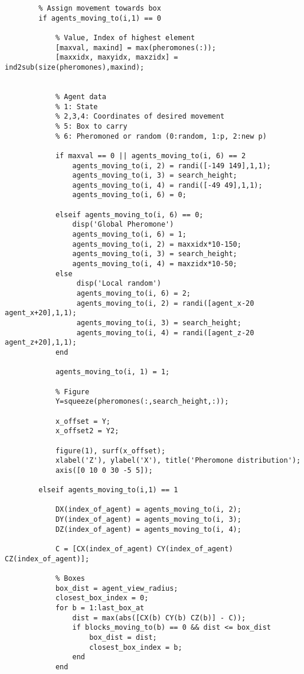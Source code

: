 \begin{lstlisting}
        % Assign movement towards box
        if agents_moving_to(i,1) == 0

            % Value, Index of highest element
            [maxval, maxind] = max(pheromones(:));
            [maxxidx, maxyidx, maxzidx] = ind2sub(size(pheromones),maxind);
            
            
            % Agent data
            % 1: State
            % 2,3,4: Coordinates of desired movement
            % 5: Box to carry
            % 6: Pheromoned or random (0:random, 1:p, 2:new p)
            
            if maxval == 0 || agents_moving_to(i, 6) == 2
                agents_moving_to(i, 2) = randi([-149 149],1,1);
                agents_moving_to(i, 3) = search_height; 
                agents_moving_to(i, 4) = randi([-49 49],1,1);
                agents_moving_to(i, 6) = 0;
                
            elseif agents_moving_to(i, 6) == 0;
                disp('Global Pheromone')
                agents_moving_to(i, 6) = 1;
                agents_moving_to(i, 2) = maxxidx*10-150;
                agents_moving_to(i, 3) = search_height; 
                agents_moving_to(i, 4) = maxzidx*10-50;
            else 
                 disp('Local random')
                 agents_moving_to(i, 6) = 2;
                 agents_moving_to(i, 2) = randi([agent_x-20 agent_x+20],1,1);
                 agents_moving_to(i, 3) = search_height; 
                 agents_moving_to(i, 4) = randi([agent_z-20 agent_z+20],1,1);
            end
            
            agents_moving_to(i, 1) = 1;
            
            % Figure
            Y=squeeze(pheromones(:,search_height,:));
            
            x_offset = Y;
            x_offset2 = Y2;

            figure(1), surf(x_offset);
            xlabel('Z'), ylabel('X'), title('Pheromone distribution');
            axis([0 10 0 30 -5 5]);

        elseif agents_moving_to(i,1) == 1
            
            DX(index_of_agent) = agents_moving_to(i, 2);
            DY(index_of_agent) = agents_moving_to(i, 3);
            DZ(index_of_agent) = agents_moving_to(i, 4);
            
            C = [CX(index_of_agent) CY(index_of_agent) CZ(index_of_agent)];

            % Boxes
            box_dist = agent_view_radius;
            closest_box_index = 0;
            for b = 1:last_box_at 
                dist = max(abs([CX(b) CY(b) CZ(b)] - C));
                if blocks_moving_to(b) == 0 && dist <= box_dist
                    box_dist = dist;
                    closest_box_index = b;
                end
            end
           

\end{lstlisting}
